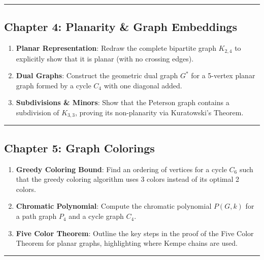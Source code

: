 \documentclass[
]{book}
\providecommand{\tightlist}{%
  \setlength{\itemsep}{0pt}\setlength{\parskip}{0pt}}
\theoremstyle{definition}
\theoremstyle{definition}
\theoremstyle{definition}
\theoremstyle{definition}
\theoremstyle{remark}
\begin{document}
\begin{center}\rule{0.5\linewidth}{0.5pt}\end{center}

\subsection{Chapter 4: Planarity \& Graph Embeddings}\label{chapter-4-planarity-graph-embeddings}

\begin{enumerate}
\def\labelenumi{\arabic{enumi}.}
\tightlist
\item
  \textbf{Planar Representation}: Redraw the complete bipartite graph \(K_{2,4}\) to explicitly show that it is planar (with no crossing edges).
\item
  \textbf{Dual Graphs}: Construct the geometric dual graph \(G^*\) for a 5-vertex planar graph formed by a cycle \(C_4\) with one diagonal added.
\item
  \textbf{Subdivisions \& Minors}: Show that the Peterson graph contains a subdivision of \(K_{3,3}\), proving its non-planarity via Kuratowski's Theorem.
\end{enumerate}

\begin{center}\rule{0.5\linewidth}{0.5pt}\end{center}

\subsection{Chapter 5: Graph Colorings}\label{chapter-5-graph-colorings}

\begin{enumerate}
\def\labelenumi{\arabic{enumi}.}
\tightlist
\item
  \textbf{Greedy Coloring Bound}: Find an ordering of vertices for a cycle \(C_6\) such that the greedy coloring algorithm uses 3 colors instead of its optimal 2 colors.
\item
  \textbf{Chromatic Polynomial}: Compute the chromatic polynomial \(P(G, k)\) for a path graph \(P_4\) and a cycle graph \(C_4\).
\item
  \textbf{Five Color Theorem}: Outline the key steps in the proof of the Five Color Theorem for planar graphs, highlighting where Kempe chains are used.
\end{enumerate}

\begin{center}\rule{0.5\linewidth}{0.5pt}\end{center}
\end{document}
